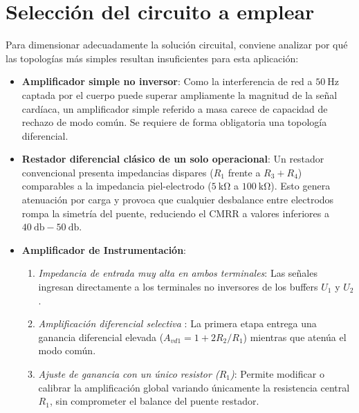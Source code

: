 \section{Selección del circuito a emplear}

Para dimensionar adecuadamente la solución circuital, conviene analizar por qué las topologías más simples resultan insuficientes para esta aplicación:

\begin{itemize}

  \item \textbf{Amplificador simple no inversor}: Como la interferencia de red a
      $\SI{50}{\hertz}$ captada por el cuerpo puede superar ampliamente la
        magnitud de la señal cardíaca, un amplificador simple referido a masa
        carece de capacidad de rechazo de modo común. Se requiere de forma obligatoria una topología
        diferencial.

  \item \textbf{Restador diferencial clásico de un solo operacional}: Un
      restador convencional presenta impedancias dispares ($R_1$ frente a $R_3 +
        R_4$) comparables a la impedancia piel-electrodo ($\SI{5}{\kilo\ohm}$ a
        $\SI{100}{\kilo\ohm}$). Esto genera atenuación por carga y provoca que
        cualquier desbalance entre electrodos
        rompa la simetría del puente, reduciendo el CMRR a valores inferiores a
        $\SI{40}{\decibel} - \SI{50}{\decibel}$.

  \item \textbf{Amplificador de Instrumentación}:

  \begin{enumerate}

      \item \textit{Impedancia de entrada muy alta en ambos terminales}: Las señales ingresan directamente a los
          terminales no inversores de los buffers $U_1$ y $U_2$.
    \item \textit{Amplificación diferencial selectiva }: La primera etapa entrega una ganancia diferencial elevada
          ($A_{vd1} = 1 + 2R_2/R_1$) mientras que atenúa el modo común.
    \item \textit{Ajuste de ganancia con un único resistor ($R_1$)}: Permite
        modificar o calibrar la amplificación global variando únicamente la
          resistencia central $R_1$, sin comprometer el balance del puente
          restador.
  \end{enumerate}
\end{itemize}

